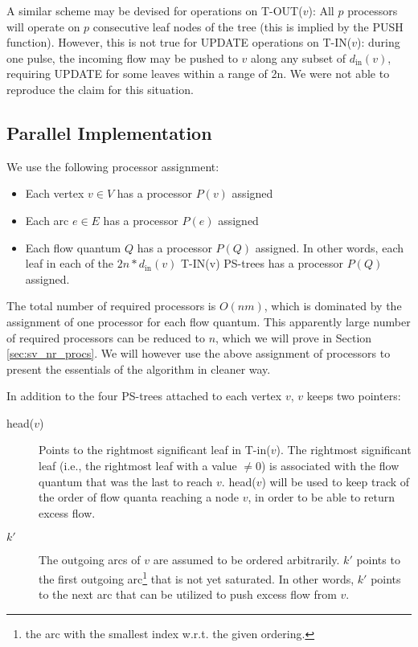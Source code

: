 \documentclass[a4paper,10pt, twocolumn]{article}
\begin{document}
A similar scheme may be devised for operations on T-OUT($v$): All $p$ processors will operate on $p$ consecutive leaf nodes of the tree (this is implied by the PUSH function). However, this is not true for UPDATE operations on T-IN($v$): during one pulse, the incoming flow may be pushed to $v$ along any subset of $d_{\mathrm{in}}(v)$, requiring UPDATE for some leaves within a range of 2n. We were not able to reproduce the claim for this situation. 

\subsection{Parallel Implementation}
\label{sec:sv_parImpl}
We use the following processor assignment:
\begin{itemize}
	\item Each vertex $v \in V$ has a processor $P(v)$ assigned
	\item Each arc $e \in E$ has a processor $P(e)$ assigned
	\item Each flow quantum $Q$ has a processor $P(Q)$ assigned. In other words, each leaf in each of the $2n * d_{\mathrm{in}}(v)$ T-IN(v) PS-trees has a processor $P(Q)$ assigned.
\end{itemize}

The total number of required processors is $O(nm)$, which is dominated by the assignment of one processor for each flow quantum. This apparently large number of required processors can be reduced to $n$, which we will prove in Section \ref{sec:sv_nr_procs}. We will however use the above assignment of processors to present the essentials of the algorithm in cleaner way.   

In addition to the four PS-trees attached to each vertex $v$, $v$ keeps two pointers:
\begin{description}
	\item [head($v$)] Points to the rightmost significant leaf in T-in($v$). The rightmost significant leaf (i.e., the rightmost leaf with a value $\neq 0$) is associated with the flow quantum that was the last to reach $v$. head($v$) will be used to keep track of the order of flow quanta reaching a node $v$, in order to be able to return excess flow. 
	\item [$k'$] The outgoing arcs of $v$ are assumed to be ordered arbitrarily. $k'$ points to the first outgoing arc\footnote{the arc with the smallest index w.r.t. the given ordering.} that is not yet saturated. In other words, $k'$ points to the next arc that can be utilized to push excess flow from $v$.  
\end{description}
\end{document}
